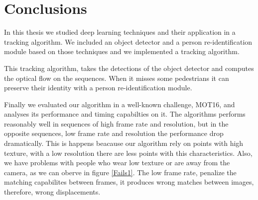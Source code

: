 \chapter{Conclusions}\label{cap.conclusions}



In this thesis we studied deep learning techniques and their application in a tracking algorithm. We included an object detector and a person re-identification module based on those techniques and we implemented a tracking algorithm.

This tracking algorithm, takes the detections of the object detector and computes the optical flow on the sequences. When it misses some pedestrians it can preserve their identity with a person re-identification module.

Finally we evaluated our algorithm in a well-known challenge, MOT16, and analyses its performance and timing capabilties on it. The algorithms performs reasonably well in sequences of high frame rate and resolution, but in the opposite sequences, low frame rate and resolution the performance drop dramatically. This is happens beacause our algorithm rely on points with high texture, with a low resolution there are less points with this characteristics. Also, we have problems with people who wear low texture or are away from the camera, as we can oberve in figure \ref{Fails1}. The low frame rate, penalize the matching capabilites between frames, it produces wrong matches between images, therefore, wrong displacements.




